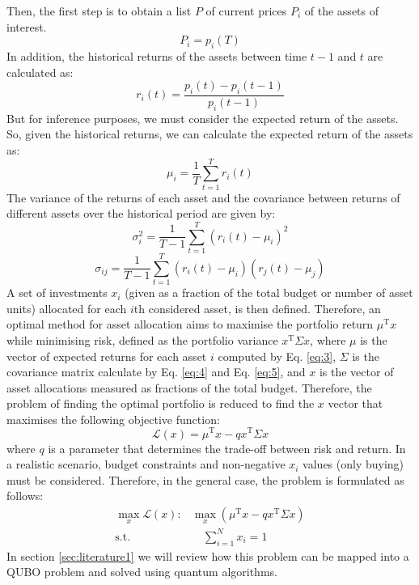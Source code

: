 \documentclass[prx,twocolumn,floatfix,superscriptaddress,longbibliography]{revtex4-1}
\begin{document}
Then, the first step is to obtain a list $P$ of current prices $P_i$  of the assets of interest.
\begin{equation}
  \label{eq:1}
  P_i = p_i(T)
\end{equation}
In addition, the historical returns of the assets between time $t-1$ and $t$ are calculated as:
\begin{equation}
  \label{eq:2}
  r_i(t) = \frac{p_i(t) - p_i(t-1)}{p_i(t-1)}
\end{equation}
But for inference purposes, we must consider the expected return of the assets. So, given the historical returns, we can calculate the expected return of the assets as:
\begin{equation}
  \label{eq:3}
  \mu_i = \frac{1}{T} \sum_{t=1}^{T} r_i(t)
\end{equation}
The variance of the returns of each asset and the covariance between returns of different assets over the historical period are given by:
\begin{equation}
  \label{eq:4}
  \sigma_i^2 = \frac{1}{T-1} \sum_{t=1}^{T} (r_i(t) - \mu_i)^2
\end{equation}
\begin{equation}
  \label{eq:5}
  \sigma_{ij} = \frac{1}{T-1} \sum_{t=1}^{T} (r_i(t) - \mu_i)(r_j(t) - \mu_j)
\end{equation}
A set of investments $x_i$ (given as a fraction of the total budget or number of asset units) allocated for each $i$th considered asset, 
is then defined. Therefore, an optimal method for asset allocation aims to maximise the portfolio return 
$\mu^\text{T} x$ while minimising risk, defined as the portfolio variance $x^\text{T}\Sigma x$, where $\mu$ is the vector of expected returns for each asset $i$ computed by Eq. \ref{eq:3}, $\Sigma$ is the covariance matrix calculate by Eq. \ref{eq:4} and Eq. \ref{eq:5}, and $x$ is the vector 
of asset allocations measured as fractions of the total budget. Therefore, the problem of finding the optimal portfolio is reduced to find the $x$ vector that maximises the following objective function: 
\begin{equation}
  \label{eq:6}
  \mathcal{L}(x) = \mu^\text{T} x - q x^\text{T}\Sigma x
\end{equation}
where $q$ is a parameter that determines the trade-off between risk and return.  In a realistic scenario, budget constraints and non-negative 
$x_i$ values (only buying) must be considered. Therefore, in the general case, the problem is formulated as follows:
\begin{equation}
\begin{aligned}
  \label{eq:7}
  \max_{x} \mathcal{L}(x): & \max_{x}\left(\mu^\text{T} x - q x^\text{T}\Sigma x \right) \\ 
  \text{s.t.} & \quad \sum_{i=1}^{N} x_i = 1 
\end{aligned}
\end{equation}
In section \ref{sec:literature1} we will review how this problem can be mapped into a QUBO problem and solved using quantum algorithms.
\end{document}
